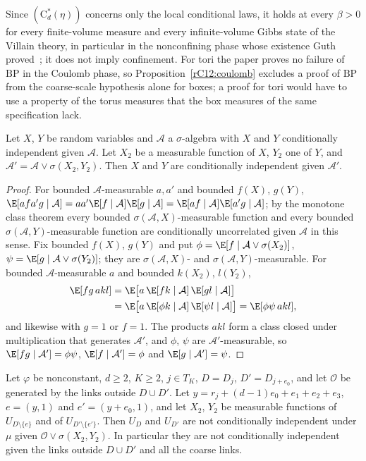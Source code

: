 Since $(\mathrm C^*_d(\eta))$ concerns only the local conditional laws, it
holds at every $\beta>0$ for every finite-volume measure and every
infinite-volume Gibbs state of the Villain theory, in particular in the
nonconfining phase whose existence Guth proved~\cite{Gut80}; it does not
imply confinement. For tori the paper proves no failure of $\mathrm{BP}$ in
the Coulomb phase, so Proposition~\ref{rC12:coulomb} excludes a proof of
$\mathrm{BP}$ from the coarse-scale hypothesis alone for boxes; a proof for
tori would have to use a property of the torus measures that the box
measures of the same specification lack.

\begin{lemma}\label{rC12:condind}
Let $X$, $Y$ be random variables and $\mathcal A$ a $\sigma$-algebra with
$X$ and $Y$ conditionally independent given $\mathcal A$. Let $X_2$ be a
measurable function of $X$, $Y_2$ one of $Y$, and $\mathcal A'=\mathcal A
\vee\sigma(X_2,Y_2)$. Then $X$ and $Y$ are conditionally independent given
$\mathcal A'$.
\end{lemma}

\begin{proof}
For bounded $\mathcal A$-measurable $a,a'$ and bounded $f(X)$, $g(Y)$,
$\E[afa'g\mid\mathcal A]=aa'\E[f\mid\mathcal A]\E[g\mid\mathcal A]=\E[af
\mid\mathcal A]\E[a'g\mid\mathcal A]$; by the monotone class theorem every
bounded $\sigma(\mathcal A,X)$-measurable function and every bounded
$\sigma(\mathcal A,Y)$-measurable function are conditionally uncorrelated
given $\mathcal A$ in this sense. Fix bounded $f(X)$, $g(Y)$ and put $\phi=
\E[f\mid\mathcal A\vee\sigma(X_2)]$, $\psi=\E[g\mid\mathcal A\vee
\sigma(Y_2)]$; they are $\sigma(\mathcal A,X)$- and $\sigma(\mathcal
A,Y)$-measurable. For bounded $\mathcal A$-measurable $a$ and bounded
$k(X_2)$, $l(Y_2)$,
\[
\begin{split}
\E[fg\,akl]&=\E\bigl[a\,\E[fk\mid\mathcal A]\,\E[gl\mid\mathcal A]\bigr]\\
&=\E\bigl[a\,\E[\phi k\mid\mathcal A]\,\E[\psi l\mid\mathcal A]\bigr]=
\E[\phi\psi\,akl],
\end{split}
\]
and likewise with $g=1$ or $f=1$. The products $akl$ form a class closed
under multiplication that generates $\mathcal A'$, and $\phi$, $\psi$ are
$\mathcal A'$-measurable, so $\E[fg\mid\mathcal A']=\phi\psi$, $\E[f\mid
\mathcal A']=\phi$ and $\E[g\mid\mathcal A']=\psi$.
\end{proof}

\begin{proposition}\label{rC12:nogo}
Let $\varphi$ be nonconstant, $d\ge2$, $K\ge2$, $j\in T_K$, $D=D_j$,
$D'=D_{j+e_0}$, and let $\mathcal O$ be generated by the links outside
$D\cup D'$. Let $y=r_j+(d-1)e_0+e_1+e_2+e_3$, $e=(y,1)$ and $e'=(y+e_0,1)$,
and let $X_2$, $Y_2$ be measurable functions of $U_{D\setminus\{e\}}$ and
of $U_{D'\setminus\{e'\}}$. Then $U_D$ and $U_{D'}$ are not conditionally
independent under $\mu$ given $\mathcal O\vee\sigma(X_2,Y_2)$. In
particular they are not conditionally independent given the links outside
$D\cup D'$ and all the coarse links.
\end{proposition}


